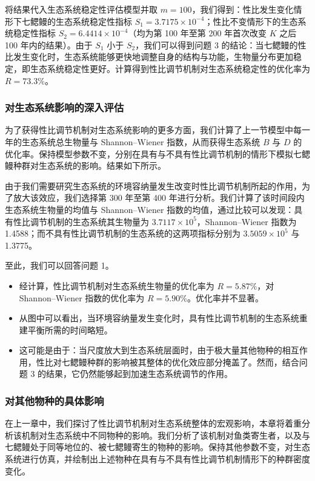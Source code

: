 \documentclass[11pt,a4paper]{ctexart}
\begin{document}
将结果代入生态系统稳定性评估模型并取 $m=100$，我们得到：性比发生变化情形下七鳃鳗的生态系统稳定性指标 $S_1=3.7175\times 10^{-4}$；性比不变情形下的生态系统稳定性指标 $S_2=6.4414\times 10^{-4}$（均为第 100 年至第 200 年首次改变 $K$ 之后 100 年内的结果）。由于 $S_1$ 小于 $S_2$，我们可以得到问题 3 的结论：当七鳃鳗的性比发生变化时，生态系统能够更快地调整自身的结构与功能，生物量分布更加稳定，即生态系统稳定性更好。计算得到性比调节机制对生态系统稳定性的优化率为 $R=73.3\%$。

\subsubsection{对生态系统影响的深入评估}

为了获得性比调节机制对生态系统影响的更多方面，我们计算了上一节模型中每一年的生态系统总生物量与 Shannon--Wiener 指数，从而获得生态系统 $B$ 与 $D$ 的优化率。保持模型参数不变，分别在具有与不具有性比调节机制的情形下模拟七鳃鳗种群对生态系统的影响。结果如下所示。

由于我们需要研究生态系统的环境容纳量发生改变时性比调节机制所起的作用，为了放大该效应，我们选择第 300 年至第 400 年进行分析。我们计算了该时间段内生态系统生物量的均值与 Shannon--Wiener 指数的均值，通过比较可以发现：具有性比调节机制的生态系统其生物量为 $3.7117\times 10^{5}$，Shannon--Wiener 指数为 1.4588；而不具有性比调节机制的生态系统的这两项指标分别为 $3.5059\times 10^{5}$ 与 1.3775。

至此，我们可以回答问题 1。

\begin{itemize}
\item 经计算，性比调节机制对生态系统生物量的优化率为 $R=5.87\%$，对 Shannon--Wiener 指数的优化率为 $R=5.90\%$。优化率并不显著。
\item 从图中可以看出，当环境容纳量发生变化时，具有性比调节机制的生态系统重建平衡所需的时间略短。
\item 这可能是由于：当尺度放大到生态系统层面时，由于极大量其他物种的相互作用，性比对七鳃鳗种群的影响被其整体的优化效应部分掩盖了。然而，结合问题 3 的结果，它仍然能够起到加速生态系统调节的作用。
\end{itemize}

\subsubsection{对其他物种的具体影响}

在上一章中，我们探讨了性比调节机制对生态系统整体的宏观影响，本章将着重分析该机制对生态系统中不同物种的影响。我们分析了该机制对鱼类寄生者，以及与七鳃鳗处于同等地位的、被七鳃鳗寄生的物种的影响。保持其他参数不变，对生态系统进行仿真，并绘制出上述物种在具有与不具有性比调节机制情形下的种群密度变化。
\end{document}
